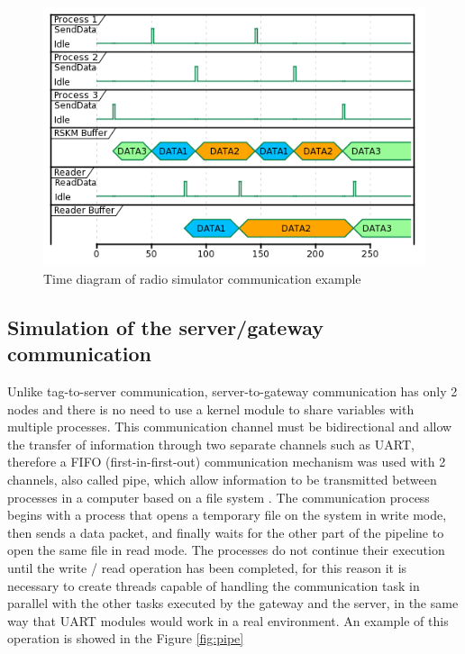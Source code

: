 \documentclass[journal]{IEEEtran}	%
\begin{document}
\begin{figure}[t]
\centering
\includegraphics[width=0.98\columnwidth]{radiokernel.png}
\caption{Time diagram of radio simulator communication example}
\label{fig:radio_kernel}
\end{figure}

\subsection{Simulation of the server/gateway communication}

Unlike tag-to-server communication, server-to-gateway communication has only 2 nodes and there is no need to use a kernel module to share variables with multiple processes. This communication channel must be bidirectional and allow the transfer of information through two separate channels such as UART, therefore a FIFO (first-in-first-out) communication mechanism was used with 2 channels, also called pipe, which allow information to be transmitted between processes in a computer based on a file system \cite{fifo}. The communication process begins with a process that opens a temporary file on the system in write mode, then sends a data packet, and finally waits for the other part of the pipeline to open the same file in read mode. The processes do not continue their execution until the write / read operation has been completed, for this reason it is necessary to create threads capable of handling the communication task in parallel with the other tasks executed by the gateway and the server, in the same way that UART modules would work in a real environment. An example of this operation is showed in the Figure \ref{fig:pipe}
\end{document}
